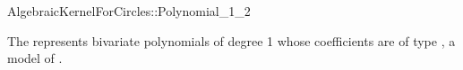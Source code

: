 \begin{ccRefConcept}{AlgebraicKernelForCircles::Polynomial_1_2}

\ccDefinition

The  represents bivariate
polynomials of degree 1 whose coefficients are of type , a
model of .

\ccTypes

\ccCreation
{}







\ccHasModels


\ccSeeAlso


\end{ccRefConcept}
